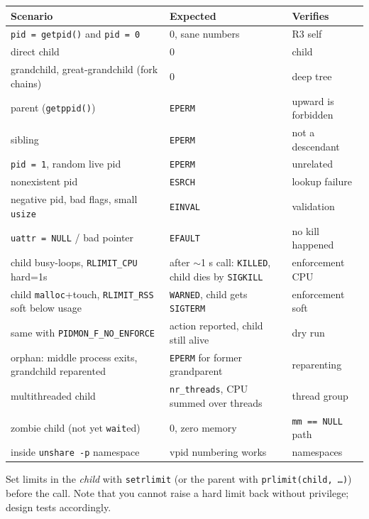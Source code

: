 \documentclass[11pt,a4paper]{article}
\begin{document}
\begin{center}\small
\begin{tabular}{@{}p{5.6cm}p{5.2cm}p{3.5cm}@{}}
\toprule
Scenario & Expected & Verifies \\
\midrule
\texttt{pid = getpid()} and \texttt{pid = 0} & 0, sane numbers & R3 self \\
direct child & 0 & child \\
grandchild, great-grandchild (fork chains) & 0 & deep tree \\
parent (\texttt{getppid()}) & \texttt{EPERM} & upward is forbidden \\
sibling & \texttt{EPERM} & not a descendant \\
\texttt{pid = 1}, random live pid & \texttt{EPERM} & unrelated \\
nonexistent pid & \texttt{ESRCH} & lookup failure \\
negative pid, bad flags, small \texttt{usize} & \texttt{EINVAL} & validation \\
\texttt{uattr = NULL} / bad pointer & \texttt{EFAULT} & no kill happened \\
child busy-loops, \texttt{RLIMIT\_CPU} hard=1s & after $\sim$1 s call: \texttt{KILLED}, child dies by \texttt{SIGKILL} & enforcement CPU \\
child \texttt{malloc}+touch, \texttt{RLIMIT\_RSS} soft below usage & \texttt{WARNED}, child gets \texttt{SIGTERM} & enforcement soft \\
same with \texttt{PIDMON\_F\_NO\_ENFORCE} & action reported, child still alive & dry run \\
orphan: middle process exits, grandchild reparented & \texttt{EPERM} for former grandparent & reparenting \\
multithreaded child & \texttt{nr\_threads}, CPU summed over threads & thread group \\
zombie child (not yet \texttt{wait}ed) & 0, zero memory & \texttt{mm == NULL} path \\
inside \texttt{unshare -p} namespace & vpid numbering works & namespaces \\
\bottomrule
\end{tabular}
\end{center}

Set limits in the \emph{child} with \texttt{setrlimit} (or the parent with \texttt{prlimit(child, \dots)}) before the call. Note that you cannot raise a hard limit back without privilege; design tests accordingly.
\end{document}
